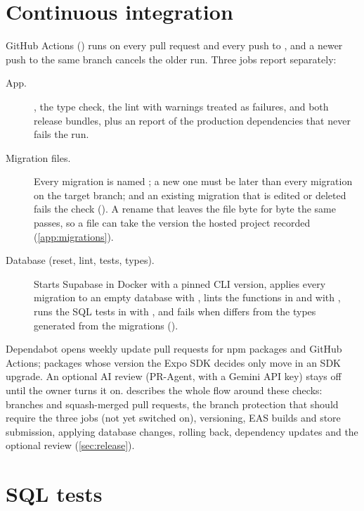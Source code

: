 \section{Continuous integration}
\label{sec:ci}

GitHub Actions () runs on every pull request and every push to
, and a newer push to the same branch cancels the older run. Three jobs report separately:

\begin{description}
  \item[App.] , the type check, the lint with warnings treated as failures, 
    and both release bundles, plus an  report of the production dependencies that never
    fails the run.
  \item[Migration files.] Every migration is named ; a new one must be
    later than every migration on the target branch; and an existing migration that is edited or deleted
    fails the check (). A rename that leaves the file byte for byte the
    same passes, so a file can take the version the hosted project recorded (\cref{app:migrations}).
  \item[Database (reset, lint, tests, types).] Starts Supabase in Docker with a pinned CLI version, applies
    every migration to an empty database with , lints the functions in
     and  with , runs the SQL tests in
     with , and fails when 
    differs from the types generated from the migrations ().
\end{description}

Dependabot opens weekly update pull requests for npm packages and GitHub Actions; packages whose version
the Expo SDK decides only move in an SDK upgrade. An optional AI review (PR-Agent, with a Gemini API key)
stays off until the owner turns it on.  describes the whole flow around these
checks: branches and squash-merged pull requests, the branch protection that should require the three
jobs (not yet switched on), versioning, EAS builds and store submission, applying database changes,
rolling back, dependency updates and the optional review (\cref{sec:release}).

\section{SQL tests}

